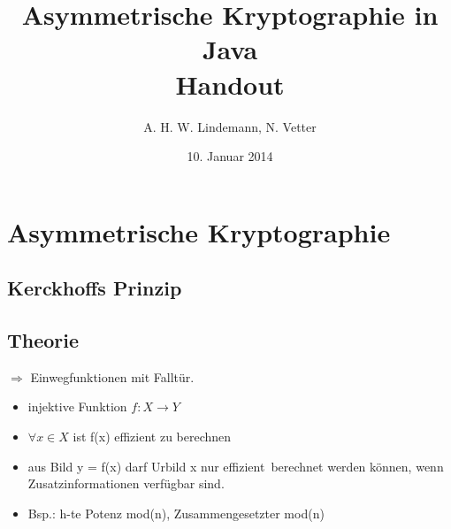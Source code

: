 \documentclass[10pt,a4paper]{article}
\title{Asymmetrische Kryptographie in Java\\Handout}
\author{A. H. W. Lindemann, N. Vetter}
\date{10. Januar 2014}
\begin{document}
\maketitle
\section{Asymmetrische Kryptographie}
\subsection{Kerckhoffs Prinzip}
\begin{center}
\Large
{}
\end{center}

\subsection{Theorie}

$\Rightarrow$ Einwegfunktionen mit Falltür.
\begin{itemize}
\item injektive Funktion $f:X \rightarrow Y$
\item $\forall x \in X$ ist f(x) effizient zu berechnen
\item aus Bild y = f(x) darf Urbild x nur \glqq effizient\grqq ~berechnet werden können, wenn Zusatzinformationen verfügbar sind.
\item Bsp.: h-te Potenz mod(n), Zusammengesetzter mod(n)
\end{itemize}
\end{document}
